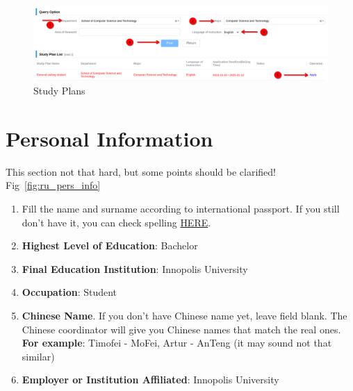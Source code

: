 \begin{figure}[htpb]
    \centering
    \includegraphics[width=\textwidth]{russia/imgs/app_3_study_plan}
    \caption{\centering Study Plans}
    \label{fig:ru_study_plan}
\end{figure}








\section{Personal Information}\label{sec:ru_personal_info}

This section not that hard, but some points should be clarified!
Fig~\ref{fig:ru_pers_info}

\begin{enumerate}
    \item Fill the name and surname according to international passport.
        If you still don't have it, you can check spelling
        \href{https://www.gosuslugi.ru/help/faq/foreign_passport/100359}{HERE}.

    \item \textbf{Highest Level of Education}: Bachelor

    \item \textbf{Final Education Institution}: Innopolis University

    \item \textbf{Occupation}: Student

    \item \textbf{Chinese Name}.
        If you don't have Chinese name yet, leave field blank.
        The Chinese coordinator will give you Chinese names that match the real ones. \\
        \textbf{For example}: Timofei - MoFei, Artur - AnTeng (it may sound not that similar)

    \item \textbf{Employer or Institution Affiliated}: Innopolis University
\end{enumerate}


